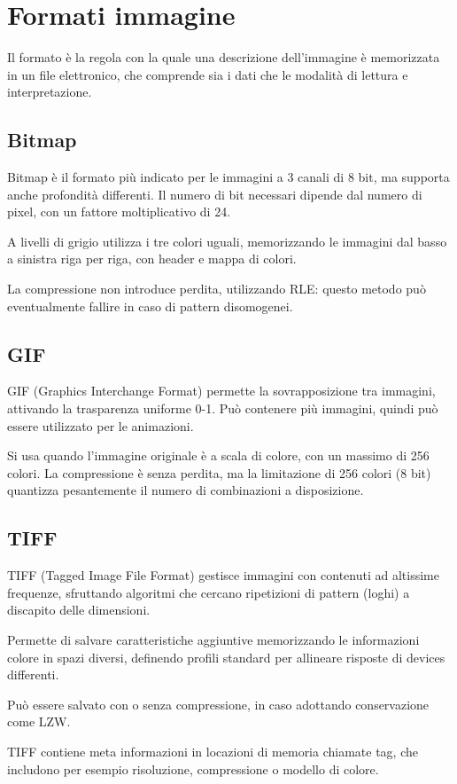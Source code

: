 \section{Formati immagine}
Il formato è la regola con la quale una descrizione dell'immagine è memorizzata in un file elettronico, che comprende sia i dati che le modalità di lettura e interpretazione.

\subsection{Bitmap}
Bitmap è il formato più indicato per le immagini a 3 canali di 8 bit, ma supporta anche profondità differenti. Il numero di bit necessari dipende dal numero di pixel, con un fattore moltiplicativo di 24.

A livelli di grigio utilizza i tre colori uguali, memorizzando le immagini dal basso a sinistra riga per riga, con header e mappa di colori.

La compressione non introduce perdita, utilizzando RLE: questo metodo può eventualmente fallire in caso di pattern disomogenei. 

\subsection{GIF}
GIF (Graphics Interchange Format) permette la sovrapposizione tra immagini, attivando la trasparenza uniforme 0-1. Può contenere più immagini, quindi può essere utilizzato per le animazioni.

Si usa quando l'immagine originale è a scala di colore, con un massimo di 256 colori. La compressione è senza perdita, ma la limitazione di 256 colori (8 bit) quantizza pesantemente il numero di combinazioni a disposizione.

\subsection{TIFF}
TIFF (Tagged Image File Format) gestisce immagini con contenuti ad altissime frequenze, sfruttando algoritmi che cercano ripetizioni di pattern (loghi) a discapito delle dimensioni.

Permette di salvare caratteristiche aggiuntive memorizzando le informazioni colore in spazi diversi, definendo profili standard per allineare risposte di devices differenti.

Può essere salvato con o senza compressione, in caso adottando conservazione come LZW.

TIFF contiene meta informazioni in locazioni di memoria chiamate tag, che includono per esempio risoluzione, compressione o modello di colore.

